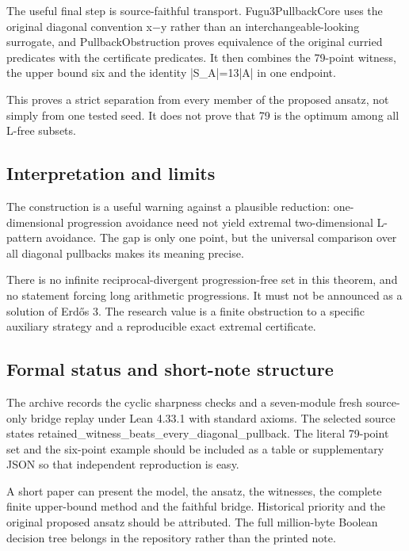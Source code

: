 \documentclass[11pt,a4paper]{article}
\begin{document}
The useful final step is source-faithful transport. Fugu3PullbackCore uses the original diagonal convention x\ensuremath{-}y rather than an interchangeable-looking surrogate, and PullbackObstruction proves equivalence of the original curried predicates with the certificate predicates. It then combines the 79-point witness, the upper bound six and the identity |S\_A|=13|A| in one endpoint.

This proves a strict separation from every member of the proposed ansatz, not simply from one tested seed. It does not prove that 79 is the optimum among all L-free subsets.

\subsection{Interpretation and limits}
The construction is a useful warning against a plausible reduction: one-dimensional progression avoidance need not yield extremal two-dimensional L-pattern avoidance. The gap is only one point, but the universal comparison over all diagonal pullbacks makes its meaning precise.

There is no infinite reciprocal-divergent progression-free set in this theorem, and no statement forcing long arithmetic progressions. It must not be announced as a solution of Erdős 3. The research value is a finite obstruction to a specific auxiliary strategy and a reproducible exact extremal certificate.

\subsection{Formal status and short-note structure}
The archive records the cyclic sharpness checks and a seven-module fresh source-only bridge replay under Lean 4.33.1 with standard axioms. The selected source states retained\_witness\_beats\_every\_diagonal\_pullback. The literal 79-point set and the six-point example should be included as a table or supplementary JSON so that independent reproduction is easy.

A short paper can present the model, the ansatz, the witnesses, the complete finite upper-bound method and the faithful bridge. Historical priority and the original proposed ansatz should be attributed. The full million-byte Boolean decision tree belongs in the repository rather than the printed note.
\end{document}
